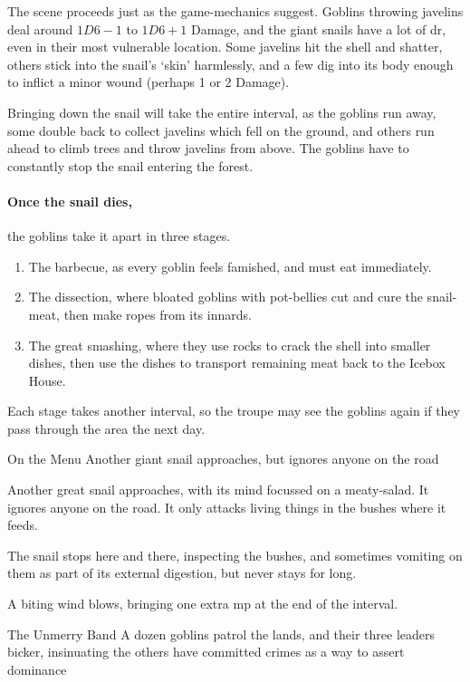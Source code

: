 The scene proceeds just as the game-mechanics suggest.
Goblins throwing javelins deal around $1D6-1$ to $1D6+1$ Damage, and the giant snails have a lot of \gls{dr}, even in their most vulnerable location.
Some javelins hit the shell and shatter, others stick into the snail's `skin' harmlessly, and a few dig into its body enough to inflict a minor wound (perhaps 1 or 2 Damage).

Bringing down the snail will take the entire \gls{interval}, as the goblins run away, some double back to collect javelins which fell on the ground, and others run ahead to climb trees and throw javelins from above.
The goblins have to constantly stop the snail entering the forest.

\paragraph{Once the snail dies,}
the goblins take it apart in three stages.

\begin{enumerate}
  \item
  The barbecue, as every goblin feels famished, and must eat immediately.
  \item
  The dissection, where bloated goblins with pot-bellies cut and cure the snail-meat, then make ropes from its innards.
  \item
  The great smashing, where they use rocks to crack the shell into smaller dishes, then use the dishes to transport remaining meat back to the Icebox House.
\end{enumerate}

Each stage takes another \gls{interval}, so the troupe may see the goblins again if they pass through the area the next day.

{On the Menu}%
{Another giant snail approaches, but ignores anyone on the road}%

Another great snail approaches, with its mind focussed on a meaty-salad.
It ignores anyone on the road.
It only attacks living things in the bushes where it feeds.

The snail stops here and there, inspecting the bushes, and sometimes vomiting on them as part of its external digestion, but never stays for long.

A biting wind blows, bringing one extra \gls{mp} at the end of the \gls{interval}.

{The Unmerry Band}%
{A dozen goblins patrol the lands, and their three leaders bicker, insinuating the others have committed crimes as a way to assert dominance}%

